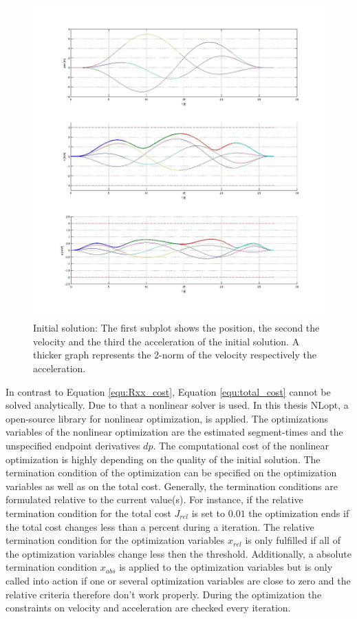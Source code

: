 \begin{figure}[h]
   \centering
   \includegraphics[width=1\textwidth]{pics/initial.jpg}
   \caption{Initial solution: The first subplot shows the position, the second the velocity and the third the acceleration of the initial solution. A thicker graph represents the 2-norm of the velocity respectively the acceleration.}
   \label{pic:initialSolution}
\end{figure}

In contrast to Equation \ref{equ:Rxx_cost}, Equation \ref{equ:total_cost} cannot be solved analytically. Due to that a nonlinear solver is used. In this thesis NLopt,  a open-source library for nonlinear optimization, is applied. The optimizations variables of the nonlinear optimization are the estimated segment-times and the unspecified endpoint derivatives $dp$. The computational cost of the nonlinear optimization is highly depending on the quality of the initial solution. \newline
The termination condition of the optimization can be specified on the optimization variables as well as on the total cost. Generally, the termination conditions are formulated relative to the current value(s). For instance, if the relative termination condition for the total cost $J_{rel}$ is set to $0.01$ the optimization ends if the total cost changes less than a percent during a iteration. The relative termination condition for the optimization variables $x_{rel}$ is only fulfilled if all of the optimization variables change less then the threshold. Additionally, a absolute termination condition $x_{abs}$ is applied to the optimization variables but is only called into action if one or several optimization variables are close to zero and the relative criteria therefore don't work properly.
During the optimization the constraints on velocity and acceleration are checked every iteration. \newline

